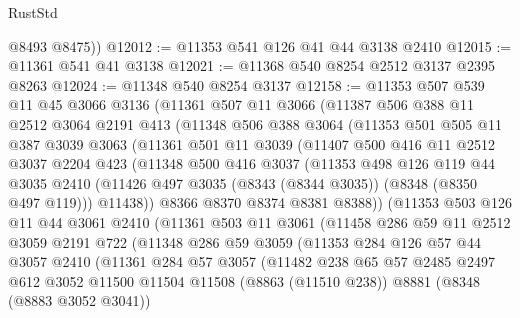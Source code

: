 \begin{lexlean}{RustStd}
\begin{coremodule}
        @8493
        @8475))
@12012 := @11353 @541 @126 @41 @44 @3138 @2410
@12015 := @11361 @541 @41 @3138
@12021 := @11368 @540 @8254 @2512 @3137 @2395 @8263
@12024 := @11348 @540 @8254 @3137
@12158 := @11353
    @507
    @539
    @11
    @45
    @3066
    @3136
    (@11361
      @507
      @11
      @3066
      (@11387
        @506
        @388
        @11
        @2512
        @3064
        @2191
        @413
        (@11348
          @506
          @388
          @3064
          (@11353
            @501
            @505
            @11
            @387
            @3039
            @3063
            (@11361
              @501
              @11
              @3039
              (@11407
                @500
                @416
                @11
                @2512
                @3037
                @2204
                @423
                (@11348
                  @500
                  @416
                  @3037
                  (@11353
                    @498
                    @126
                    @119
                    @44
                    @3035
                    @2410
                    (@11426 @497 @3035 (@8343 (@8344 @3035)) (@8348 (@8350 @497 @119)))
                    @11438))
                @8366
                @8370
                @8374
                @8381
                @8388))
            (@11353
              @503
              @126
              @11
              @44
              @3061
              @2410
              (@11361
                @503
                @11
                @3061
                (@11458
                  @286
                  @59
                  @11
                  @2512
                  @3059
                  @2191
                  @722
                  (@11348
                    @286
                    @59
                    @3059
                    (@11353
                      @284
                      @126
                      @57
                      @44
                      @3057
                      @2410
                      (@11361
                        @284
                        @57
                        @3057
                        (@11482
                          @238
                          @65
                          @57
                          @2485
                          @2497
                          @612
                          @3052
                          @11500
                          @11504
                          @11508
                          (@8863 (@11510 @238))
                          @8881
                          (@8348 (@8883 @3052 @3041))

\end{coremodule}
\end{lexlean}
